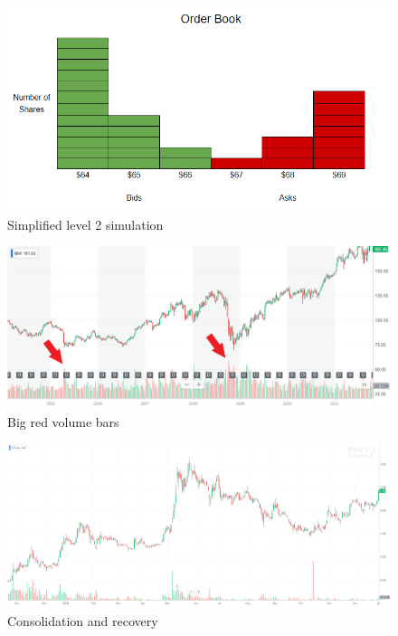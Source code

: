 \documentclass{article}
\begin{document}
\vspace{10pt}

\begin{figure}[!htb]
    \centering
    \includegraphics[width=\textwidth]{imgs/9.png}
    \caption{Simplified level 2 simulation}
\end{figure}

\vspace{10pt}

\begin{figure}[!htb]
    \centering
    \includegraphics[width=\textwidth]{imgs/10.png}
    \caption{Big red volume bars}
\end{figure}

\vspace{10pt}

\begin{figure}[!htb]
    \centering
    \includegraphics[width=\textwidth]{imgs/11.png}
    \caption{Consolidation and recovery}
\end{figure}
\end{document}
